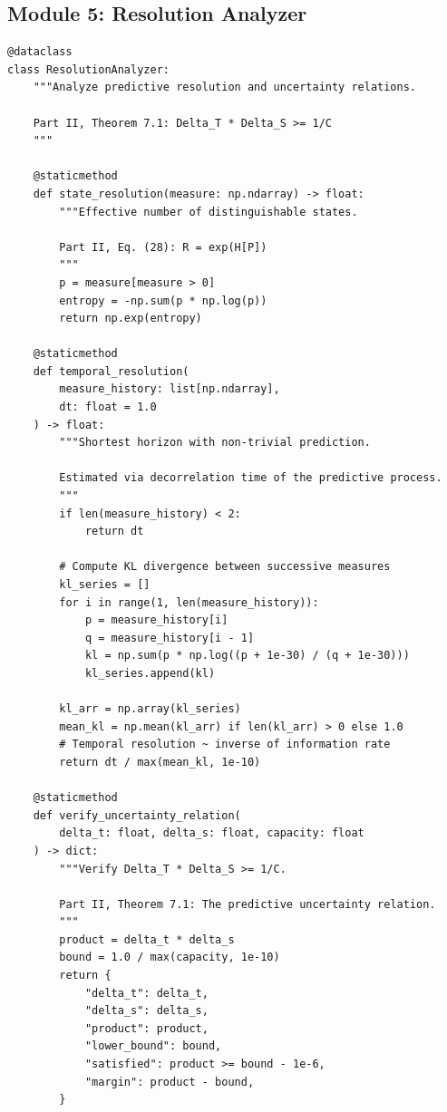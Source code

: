 \documentclass[12pt,a4paper]{article}
\theoremstyle{definition}
\begin{document}
\subsection{Module 5: Resolution Analyzer}

\begin{lstlisting}[caption={Resolution Analyzer --- Uncertainty relation (Part~II, \S 7)},label=lst:resolution]
@dataclass
class ResolutionAnalyzer:
    """Analyze predictive resolution and uncertainty relations.
    
    Part II, Theorem 7.1: Delta_T * Delta_S >= 1/C
    """
    
    @staticmethod
    def state_resolution(measure: np.ndarray) -> float:
        """Effective number of distinguishable states.
        
        Part II, Eq. (28): R = exp(H[P])
        """
        p = measure[measure > 0]
        entropy = -np.sum(p * np.log(p))
        return np.exp(entropy)
    
    @staticmethod
    def temporal_resolution(
        measure_history: list[np.ndarray],
        dt: float = 1.0
    ) -> float:
        """Shortest horizon with non-trivial prediction.
        
        Estimated via decorrelation time of the predictive process.
        """
        if len(measure_history) < 2:
            return dt
        
        # Compute KL divergence between successive measures
        kl_series = []
        for i in range(1, len(measure_history)):
            p = measure_history[i]
            q = measure_history[i - 1]
            kl = np.sum(p * np.log((p + 1e-30) / (q + 1e-30)))
            kl_series.append(kl)
        
        kl_arr = np.array(kl_series)
        mean_kl = np.mean(kl_arr) if len(kl_arr) > 0 else 1.0
        # Temporal resolution ~ inverse of information rate
        return dt / max(mean_kl, 1e-10)
    
    @staticmethod
    def verify_uncertainty_relation(
        delta_t: float, delta_s: float, capacity: float
    ) -> dict:
        """Verify Delta_T * Delta_S >= 1/C.
        
        Part II, Theorem 7.1: The predictive uncertainty relation.
        """
        product = delta_t * delta_s
        bound = 1.0 / max(capacity, 1e-10)
        return {
            "delta_t": delta_t,
            "delta_s": delta_s,
            "product": product,
            "lower_bound": bound,
            "satisfied": product >= bound - 1e-6,
            "margin": product - bound,
        }
\end{lstlisting}
\end{document}
